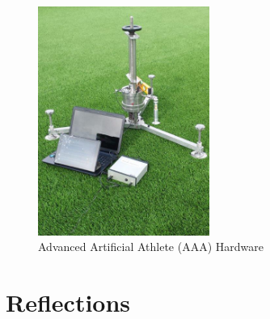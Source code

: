 \documentclass{l3proj}
\begin{document}
\begin{figure}[h]
\caption{Advanced Artificial Athlete (AAA) Hardware \cite{sportstestequip} }
\centering
\includegraphics[width=0.5\textwidth]{AAA+3.png}
\end{figure}

\section{Reflections}
\end{document}
